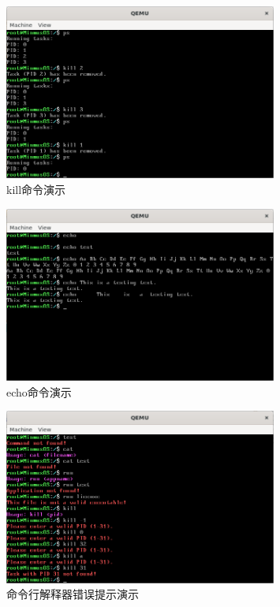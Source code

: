 \begin{figure}[htbp]
    \centering
    \includegraphics[width=0.8\textwidth]{figures/KillCommandPresentation.png}
    \caption{kill命令演示}
\end{figure}

\begin{figure}[htbp]
    \centering
    \includegraphics[width=0.8\textwidth]{figures/EchoCommandPresentation.png}
    \caption{echo命令演示}
\end{figure}

\begin{figure}[htbp]
    \centering
    \includegraphics[width=0.8\textwidth]{figures/ErrorCommandPresentation.png}
    \caption{命令行解释器错误提示演示}
\end{figure}

